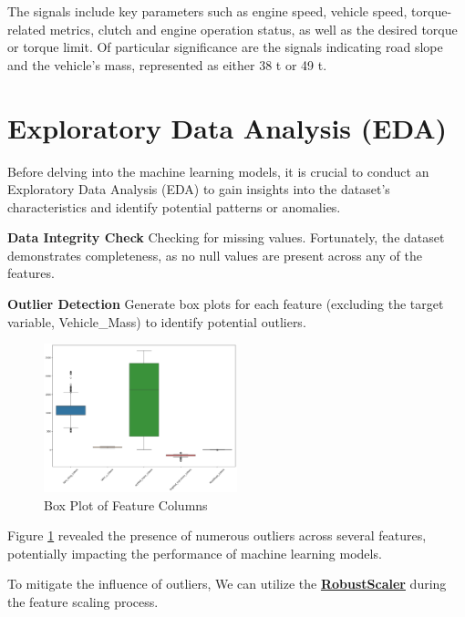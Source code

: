 \documentclass[conference]{IEEEtran}
\begin{document}
The signals include key parameters such as engine speed, vehicle speed, torque-related metrics, clutch and engine operation status, as well as the desired torque or torque limit. Of particular significance are the signals indicating road slope and the vehicle's mass, represented as either 38 t or 49 t.


\section{Exploratory Data Analysis (EDA)}
Before delving into the machine learning models, it is crucial to conduct an Exploratory Data Analysis (EDA) to gain insights into the dataset's characteristics and identify potential patterns or anomalies. 

\noindent \textbf{Data Integrity Check} \hspace{0.2em} Checking for missing values. Fortunately, the dataset demonstrates completeness, as no null values are present across any of the features.

\noindent \textbf{Outlier Detection} \hspace{0.2em} Generate box plots for each feature (excluding the target variable, Vehicle\_Mass) to identify potential outliers. 

\begin{figure}[h]
    \centering
    \includegraphics[width=0.5\textwidth]{Boxplot.png}
    \caption{Box Plot of Feature Columns }
    \label{boxplot}
\end{figure}

Figure \ref{boxplot} revealed the presence of numerous outliers across several features, potentially impacting the performance of machine learning models.

To mitigate the influence of outliers, We can utilize the \href{https://scikit-learn.org/stable/modules/generated/sklearn.preprocessing.RobustScaler.html}{\textbf{RobustScaler}} during the feature scaling process. \\
\end{document}
